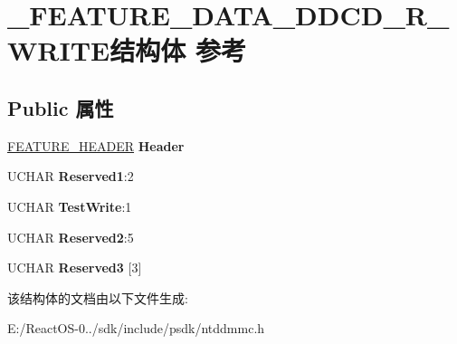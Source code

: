 \hypertarget{struct___f_e_a_t_u_r_e___d_a_t_a___d_d_c_d___r___w_r_i_t_e}{}\section{\+\_\+\+F\+E\+A\+T\+U\+R\+E\+\_\+\+D\+A\+T\+A\+\_\+\+D\+D\+C\+D\+\_\+\+R\+\_\+\+W\+R\+I\+T\+E结构体 参考}
\label{struct___f_e_a_t_u_r_e___d_a_t_a___d_d_c_d___r___w_r_i_t_e}
\subsection*{Public 属性}
\begin{DoxyCompactItemize}
\item 
\mbox{\label{struct___f_e_a_t_u_r_e___d_a_t_a___d_d_c_d___r___w_r_i_t_e_a18e6b2d5d6a01e9de397e91b06b36e58}} 
\hyperlink{struct___f_e_a_t_u_r_e___h_e_a_d_e_r}{F\+E\+A\+T\+U\+R\+E\+\_\+\+H\+E\+A\+D\+ER} {\bfseries Header}
\item 
\mbox{\label{struct___f_e_a_t_u_r_e___d_a_t_a___d_d_c_d___r___w_r_i_t_e_a95c2e69389ffc0d5d719820dcd5b500d}} 
U\+C\+H\+AR {\bfseries Reserved1}\+:2
\item 
\mbox{\label{struct___f_e_a_t_u_r_e___d_a_t_a___d_d_c_d___r___w_r_i_t_e_a5b2f4562d562c05ceb955ad71387a4f6}} 
U\+C\+H\+AR {\bfseries Test\+Write}\+:1
\item 
\mbox{\label{struct___f_e_a_t_u_r_e___d_a_t_a___d_d_c_d___r___w_r_i_t_e_adfb085c4b7eaafca648204253e07101c}} 
U\+C\+H\+AR {\bfseries Reserved2}\+:5
\item 
\mbox{\label{struct___f_e_a_t_u_r_e___d_a_t_a___d_d_c_d___r___w_r_i_t_e_a6be4d85e769f0e45f3102ca9317434b0}} 
U\+C\+H\+AR {\bfseries Reserved3} \mbox{[}3\mbox{]}
\end{DoxyCompactItemize}


该结构体的文档由以下文件生成\+:\begin{DoxyCompactItemize}
\item 
E\+:/\+React\+O\+S-\/0../sdk/include/psdk/ntddmmc.\+h\end{DoxyCompactItemize}
